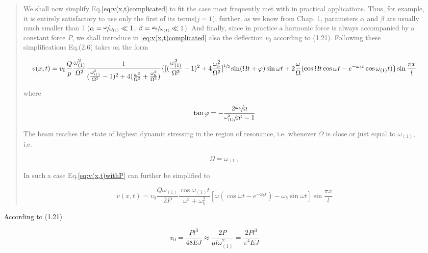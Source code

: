\begin{appendices}
\begin{quote}
We shall now simplify Eq.\ref{eq:v(x,t)complicated} to fit the case most frequently met with in practical applications. Thus, for example, it is entirely satisfactory to use only the first of its terms($j=1$); further, as we know from Chap. 1, parameters $\alpha$ and $\beta$ are usually much smaller than 1 ($\alpha = \sfrac{\omega}{\omega_{(1)}} \ll 1$, $\beta = \sfrac{\omega_b}{\omega_{(1)}} \ll 1$). And finally, since in practice a harmonic force is always accompanied by a constant force $P$, we shall introduce in \ref{eq:v(x,t)complicated} also the deflection $v_0$ according to (1.21). Following these simplifications Eq.(2.6) takes on the form

\begin{dmath}\label{eq:v(x,t)withP}
v(x,t) = v_0 \frac{Q}{p}\frac{\omega_{(1)}^2}{\Omega^2}\frac{1}{(\frac{\omega_{(1)}^2}{\Omega^2}-1)^2+4(\frac{\omega^2}{\Omega^2}+\frac{\omega_b^2}{\Omega^2})}\{[(\frac{\omega_{(1)}^2}{\Omega^2}-1)^2+4\frac{\omega_b^2}{\Omega^2}]^{\sfrac{1}{2}} \sin (\Omega t + \varphi)\sin \omega t + 2\frac{\omega}{\Omega}(\cos \Omega t \cos \omega t - e^{-\omega_b t}\cos \omega_{(1)}t)\}\sin\frac{\pi x}{l}
\end{dmath}

where

\begin{equation}
    \tan \varphi = -\frac{2\sfrac{\omega_b}{\Omega}}{\sfrac{\omega_{(1)}^2}{\Omega^2}-1}
\end{equation}

The beam reaches the state of highest dynamic stressing in the region of resonance, i.e. whenever $\Omega$ is close or just equal to $\omega_{(1)}$, i.e.

\begin{equation}
    \Omega = \omega_{(1)}
\end{equation}

In such a case Eq.\ref{eq:v(x,t)withP} can further be simplified to 

\begin{equation}\label{eq:v(x,t)simplewithP}
    v(x,t) = v_0 \frac{Q\omega_{(1)}}{2P}\frac{\cos \omega_{(1)}t}{\omega^2+\omega_b^2}[\omega(\cos\omega t - e^{-\omega_b t})-\omega_b\sin\omega t]\sin\frac{\pi x}{l}
\end{equation}

\end{quote}

According to (1.21)

\begin{equation}
    v_0 = \frac{Pl^3}{48EJ} \approx \frac{2P}{\mu l \omega_{(1)}^2} = \frac{2Pl^3}{\pi ^4 EJ}
\end{equation}


\end{appendices}
